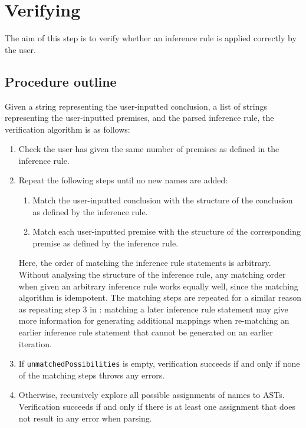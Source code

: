 \section{Verifying}
\label{checking:verifying}
The aim of this step is to verify whether an inference rule is applied correctly by the user.

\subsection{Procedure outline}
Given a string representing the user-inputted conclusion, a list of strings representing the user-inputted premises, and the parsed inference rule, the verification algorithm is as follows:
\begin{enumerate}
    \item Check the user has given the same number of premises as defined in the inference rule.
    \item Repeat the following steps until no new names are added:
    \begin{enumerate}
        \item Match the user-inputted conclusion with the structure of the conclusion as defined by the inference rule.
        \item Match each user-inputted premise with the structure of the corresponding premise as defined by the inference rule.
    \end{enumerate}
    Here, the order of matching the inference rule statements is arbitrary. Without analysing the structure of the inference rule, any matching order when given an arbitrary inference rule works equally well, since the matching algorithm is idempotent. The matching steps are repeated for a similar reason as repeating step 3 in : matching a later inference rule statement may give more information for generating additional mappings when re-matching an earlier inference rule statement that cannot be generated on an earlier iteration.
    \item If \lstinline{unmatchedPossibilities} is empty, verification succeeds if and only if none of the matching steps throws any errors.
    \item Otherwise, recursively explore all possible assignments of names to ASTs. Verification succeeds if and only if there is at least one assignment that does not result in any error when parsing.
\end{enumerate}